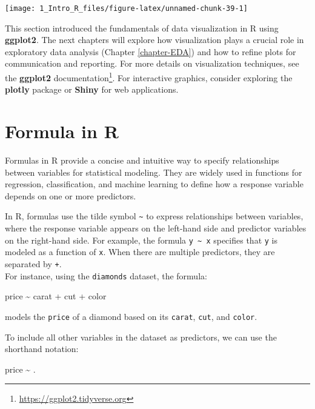 \documentclass[
  11pt,
]{book}
\makeatletter
\newenvironment{Shaded}{}{}
\newcommand{\NormalTok}[1]{#1}
\newcommand{\SpecialCharTok}[1]{\textcolor[rgb]{0.39,0.39,0.39}{#1}}
\renewcommand{\href}[2]{#2\footnote{\url{#1}}}
\newenvironment{kframe}{%
\medskip{}
\setlength{\fboxsep}{.8em}
 \def\at@end@of@kframe{}%
 \ifinner\ifhmode%
  \def\at@end@of@kframe{\end{minipage}}%
  \begin{minipage}{\columnwidth}%
 \fi\fi%
 \def\FrameCommand##1{\hskip\@totalleftmargin \hskip-\fboxsep
 \colorbox{shadecolor}{##1}\hskip-\fboxsep
     \hskip-\linewidth \hskip-\@totalleftmargin \hskip\columnwidth}%
 \MakeFramed {\advance\hsize-\width
   \@totalleftmargin\z@ \linewidth\hsize
   \@setminipage}}%
 {\par\unskip\endMakeFramed%
 \at@end@of@kframe}
\renewenvironment{Shaded}{\begin{kframe}}{\end{kframe}}
\theoremstyle{definition}
\theoremstyle{definition}
\theoremstyle{definition}
\theoremstyle{definition}
\theoremstyle{remark}
\makeatother
\begin{document}
\begin{center}\texttt{[image: 1\_Intro\_R\_files/figure-latex/unnamed-chunk-39-1]} \end{center}

This section introduced the fundamentals of data visualization in R using \textbf{ggplot2}. The next chapters will explore how visualization plays a crucial role in exploratory data analysis (Chapter \ref{chapter-EDA}) and how to refine plots for communication and reporting. For more details on visualization techniques, see the \href{https://ggplot2.tidyverse.org}{\textbf{ggplot2} documentation}. For interactive graphics, consider exploring the \textbf{plotly} package or \textbf{Shiny} for web applications.

\section{Formula in R}\label{sec-formula-in-R}

Formulas in R provide a concise and intuitive way to specify relationships between variables for statistical modeling. They are widely used in functions for regression, classification, and machine learning to define how a response variable depends on one or more predictors.

In R, formulas use the tilde symbol \texttt{\textasciitilde{}} to express relationships between variables, where the response variable appears on the left-hand side and predictor variables on the right-hand side. For example, the formula \texttt{y\ \textasciitilde{}\ x} specifies that \texttt{y} is modeled as a function of \texttt{x}. When there are multiple predictors, they are separated by \texttt{+}.\\
For instance, using the \texttt{diamonds} dataset, the formula:

\begin{Shaded}
\begin{Highlighting}[]
\NormalTok{price }\SpecialCharTok{\textasciitilde{}}\NormalTok{ carat }\SpecialCharTok{+}\NormalTok{ cut }\SpecialCharTok{+}\NormalTok{ color}
\end{Highlighting}
\end{Shaded}

models the \texttt{price} of a diamond based on its \texttt{carat}, \texttt{cut}, and \texttt{color}.

To include all other variables in the dataset as predictors, we can use the shorthand notation:

\begin{Shaded}
\begin{Highlighting}[]
\NormalTok{price }\SpecialCharTok{\textasciitilde{}}\NormalTok{ .}
\end{Highlighting}
\end{Shaded}
\end{document}
